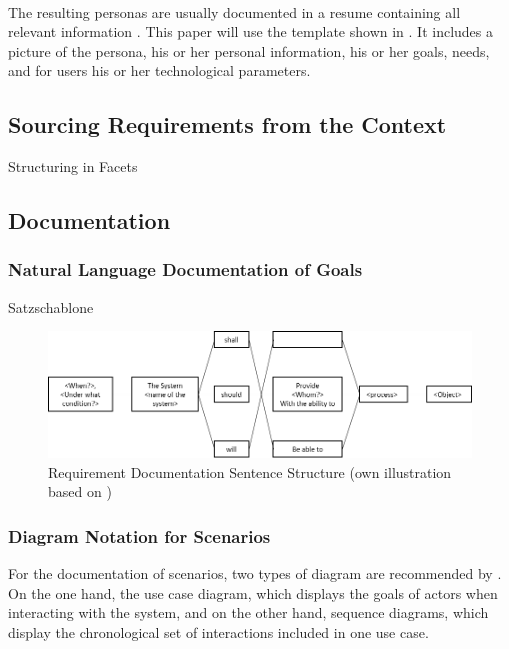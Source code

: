 \paragraph{} The resulting personas are usually documented in a resume containing all relevant information \parencites[cf.][40]{Robier.2016}[cf.][]{Platt.2016}. This paper will use the template shown in . It includes a picture of the persona, his or her personal information, his or her goals, needs, and for users his or her technological parameters.


\subsection{Sourcing Requirements from the Context}
Structuring in Facets
\clearpage
\subsection{Documentation}
\subsubsection{Natural Language Documentation of Goals}
Satzschablone
\begin{figure}[H]
    \centering
    \includegraphics[width=\textwidth]{img/SentenceStructure.png}
    \caption{Requirement Documentation Sentence Structure (own illustration based on \cite[246]{Pohl.2007})}
    \label{fig:sentencestructure}
\end{figure}
\clearpage
\subsubsection{Diagram Notation for Scenarios}
For the documentation of scenarios, two types of diagram are recommended by \textcite[299]{Pohl.2007}. On the one hand, the use case diagram, which displays the goals of actors when interacting with the system, and on the other hand, sequence diagrams, which display the chronological set of interactions included in one use case.
